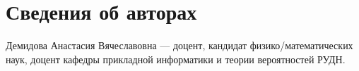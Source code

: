 \chapter*{Сведения об авторах}




Демидова Анастасия Вячеславовна --- доцент, кандидат физико\-/математических наук, доцент кафедры прикладной информатики и теории вероятностей РУДН.

